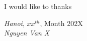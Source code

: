 I would like to thanks

\begin{flushright}
\begin{minipage}[t]{0.5\textwidth}
\begin{center}
  \textit{Hanoi}, $xx^{th}$, Month 202X\\
  
  \textit{Nguyen Van X}
\end{center}
\end{minipage}
\end{flushright}

\pagebreak
